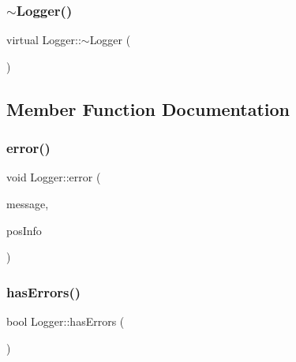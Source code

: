 \mbox{\label{classLogger_ae93f62ca3e47716b7120acb032a260f3}} 
\subsubsection{\texorpdfstring{$\sim$\+Logger()}{~Logger()}}
{\footnotesize\ttfamily virtual Logger\+::$\sim$\+Logger (\begin{DoxyParamCaption}{ }\end{DoxyParamCaption})\hspace{0.3cm}{\ttfamily [virtual]}}



\subsection{Member Function Documentation}
\mbox{\label{classLogger_a63306c62d25e4d514e8485a9566dde22}} 
\subsubsection{\texorpdfstring{error()}{error()}}
{\footnotesize\ttfamily void Logger\+::error (\begin{DoxyParamCaption}\item[{std\+::string}]{message,  }\item[{\hyperlink{classPosInfo}{Pos\+Info}}]{pos\+Info }\end{DoxyParamCaption})}

\mbox{\label{classLogger_a0a52b10db87dc64e9cb8c991162463f9}} 
\subsubsection{\texorpdfstring{has\+Errors()}{hasErrors()}}
{\footnotesize\ttfamily bool Logger\+::has\+Errors (\begin{DoxyParamCaption}{ }\end{DoxyParamCaption})}

\mbox{\label{classLogger_a261361c60868c98ab4ea4e562842da1f}} 
